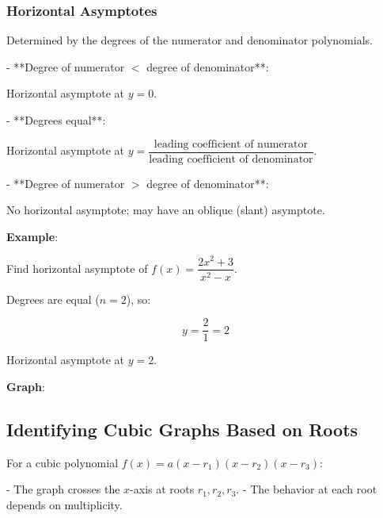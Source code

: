 \documentclass{article}
\begin{document}
\begin{multicols}{2}
\subsubsection*{Horizontal Asymptotes}

Determined by the degrees of the numerator and denominator polynomials.

- **Degree of numerator \( < \) degree of denominator**:

  Horizontal asymptote at \( y = 0 \).

- **Degrees equal**:

  Horizontal asymptote at \( y = \dfrac{\text{leading coefficient of numerator}}{\text{leading coefficient of denominator}} \).

- **Degree of numerator \( > \) degree of denominator**:

  No horizontal asymptote; may have an oblique (slant) asymptote.

\textbf{Example}:

Find horizontal asymptote of \( f(x) = \dfrac{2x^2 + 3}{x^2 - x} \).

Degrees are equal (\( n = 2 \)), so:

\[
y = \dfrac{2}{1} = 2
\]

Horizontal asymptote at \( y = 2 \).

\textbf{Graph}:

\begin{center}
\end{center}

\subsection*{Identifying Cubic Graphs Based on Roots}

For a cubic polynomial \( f(x) = a(x - r_1)(x - r_2)(x - r_3) \):

- The graph crosses the \( x \)-axis at roots \( r_1, r_2, r_3 \).
- The behavior at each root depends on multiplicity.


\end{multicols}
\end{document}
